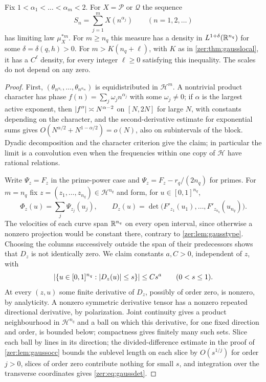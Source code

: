 \begin{theorem}\label{zer:thm:gaussscales}
Fix $1<\alpha_1<\dots<\alpha_m<2$. For $X=\mathcal P$ or $\mathcal Q$ the sequence
\begin{equation}\label{zer:eq:gaussSn}
 S_n=\sum_{j=1}^mX(n^{\alpha_j})\qquad(n=1,2,\dots)
\end{equation}
has limiting law $\mu_X^{*m}$. For $m\ge n_q$ this measure has a density in $L^{1+\delta}(\mathbb{R}^{n_q})$
for some $\delta=\delta(q,h)>0$. For $m>K(n_q+\ell)$, with $K$ as in \cref{zer:thm:gausslocal},
it has a $C^\ell$ density, for every integer $\ell\ge0$ satisfying this inequality. The scales do not
depend on any zero.
\end{theorem}
\begin{proof}
First, $(\theta_{n^{\alpha_1}},\dots,\theta_{n^{\alpha_m}})$ is equidistributed in $\mathcal H^m$. A
nontrivial product character has phase $f(n)=\sum_j\omega_jn^{\alpha_j}$ with some $\omega_j\ne0$; if
$\alpha$ is the largest active exponent, then $\lvert f''\rvert\asymp N^{\alpha-2}$ on $[N,2N]$ for large
$N$, with constants depending on the character, and the second-derivative estimate for exponential
sums \cite[Chapter~2]{GrahamKolesnik1991VanDerCorput} gives $O(N^{\alpha/2}+N^{1-\alpha/2})=o(N)$, also on
subintervals of the block. Dyadic decomposition and the character criterion give the claim; in
particular the limit is a convolution even when the frequencies within one copy of $\mathcal H$ have
rational relations.

Write $\Psi_z=F_z$ in the prime-power case and $\Psi_z=F_z-r_q/(2n_q)$ for primes. For $m=n_q$ fix
$z=(z_1,\dots,z_{n_q})\in\mathcal H^{n_q}$ and form, for $u\in[0,1]^{n_q}$,
\[
 \Phi_z(u)=\sum_j\Psi_{z_j}(u_j),\qquad D_z(u)=\det\bigl(F'_{z_1}(u_1),\dots,F'_{z_{n_q}}(u_{n_q})\bigr).
\]
The velocities of each curve span $\mathbb{R}^{n_q}$ on every open interval, since otherwise a nonzero
projection would be constant there, contrary to \cref{zer:lem:gausstype}. Choosing the columns
successively outside the span of their predecessors shows that $D_z$ is not identically zero. We
claim constants $a,C>0$, independent of $z$, with
\begin{equation}\label{zer:eq:gaussdet}
 \lvert\{u\in[0,1]^{n_q}:\lvert D_z(u)\rvert\le s\}\rvert\le Cs^a\qquad(0<s\le1).
\end{equation}
At every $(z,u)$ some finite derivative of $D_z$, possibly of order zero, is nonzero, by
analyticity. A nonzero symmetric derivative tensor has a nonzero repeated directional derivative, by
polarization. Joint continuity gives a product neighbourhood in $\mathcal H^{n_q}$ and a ball on
which this derivative, for one fixed direction and order, is bounded below; compactness gives
finitely many such sets. Slice each ball by lines in its direction; the divided-difference
estimate in the proof of \cref{zer:lem:gaussocc} bounds the sublevel length on each slice by
$O(s^{1/j})$ for order $j>0$, slices of order zero contribute nothing for small $s$, and integration
over the transverse coordinates gives \eqref{zer:eq:gaussdet}.


\end{proof}
